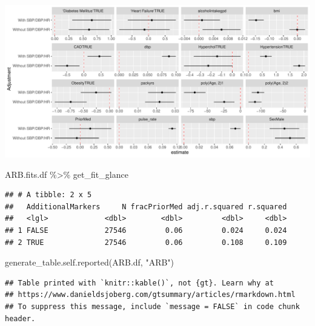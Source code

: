\documentclass[
]{article}
\newenvironment{Shaded}{\begin{snugshade}}{\end{snugshade}}
\newcommand{\FunctionTok}[1]{\textcolor[rgb]{0.00,0.00,0.00}{#1}}
\newcommand{\NormalTok}[1]{#1}
\newcommand{\SpecialCharTok}[1]{\textcolor[rgb]{0.00,0.00,0.00}{#1}}
\newcommand{\StringTok}[1]{\textcolor[rgb]{0.31,0.60,0.02}{#1}}
\begin{document}
\includegraphics{../results/report_files/figure-latex/ARB-fit-forest-1.pdf}

\begin{Shaded}
\begin{Highlighting}[]
\NormalTok{ARB.fits.df }\SpecialCharTok{\%\textgreater{}\%} 
\NormalTok{  get\_fit\_glance}
\end{Highlighting}
\end{Shaded}

\begin{verbatim}
## # A tibble: 2 x 5
##   AdditionalMarkers     N fracPriorMed adj.r.squared r.squared
##   <lgl>             <dbl>        <dbl>         <dbl>     <dbl>
## 1 FALSE             27546         0.06         0.024     0.024
## 2 TRUE              27546         0.06         0.108     0.109
\end{verbatim}

\begin{Shaded}
\begin{Highlighting}[]
\FunctionTok{generate\_table.self.reported}\NormalTok{(ARB.df, }\StringTok{"ARB"}\NormalTok{)}
\end{Highlighting}
\end{Shaded}

\begin{verbatim}
## Table printed with `knitr::kable()`, not {gt}. Learn why at
## https://www.danieldsjoberg.com/gtsummary/articles/rmarkdown.html
## To suppress this message, include `message = FALSE` in code chunk header.
\end{verbatim}
\end{document}
